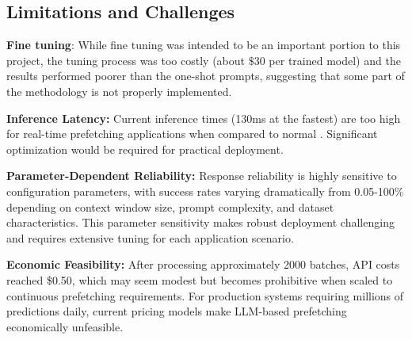 \documentclass[sigconf,authorversion,nonacm]{acmart}
\begin{document}

% 
% 


\subsection{Limitations and Challenges}

\textbf{Fine tuning}: While fine tuning was intended to be an important portion to this project, the tuning process was too costly (about $\$30$ per trained model) and the results performed poorer than the one-shot prompts, suggesting that some part of the methodology is not properly implemented.

\textbf{Inference Latency:} Current inference times (130ms at the fastest) are too high for real-time prefetching applications when compared to normal . Significant optimization would be required for practical deployment.

\textbf{Parameter-Dependent Reliability:} Response reliability is highly sensitive to configuration parameters, with success rates varying dramatically from 0.05-100\% depending on context window size, prompt complexity, and dataset characteristics. This parameter sensitivity makes robust deployment challenging and requires extensive tuning for each application scenario.

\textbf{Economic Feasibility:} After processing approximately 2000 batches, API costs reached \$0.50, which may seem modest but becomes prohibitive when scaled to continuous prefetching requirements. For production systems requiring millions of predictions daily, current pricing models make LLM-based prefetching economically unfeasible.

\end{document}
